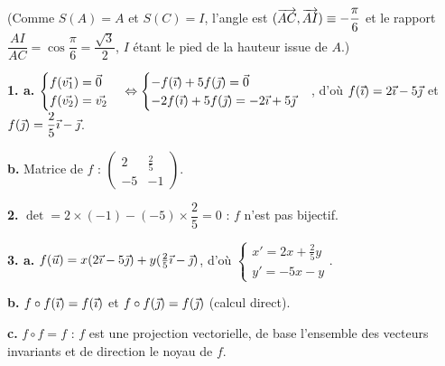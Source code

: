 \documentclass[11pt]{article}
\begin{document}
\begin{center}
\end{center}
(Comme $S(A) = A$ et $S(C) = I$, l'angle est $(\overrightarrow{AC}, \overrightarrow{AI}) \equiv -\dfrac{\pi}{6}$ et le rapport $\dfrac{AI}{AC} = \cos\dfrac{\pi}{6} = \dfrac{\sqrt{3}}{2}$, $I$ étant le pied de la hauteur issue de $A$.)

\textbf{1. a.} $\begin{cases} f(\vec{v_1}) = \vec{0} \\ f(\vec{v_2}) = \vec{v_2} \end{cases} \Leftrightarrow \begin{cases} -f(\vec{\imath}) + 5f(\vec{\jmath}) = \vec{0} \\ -2f(\vec{\imath}) + 5f(\vec{\jmath}) = -2\vec{\imath} + 5\vec{\jmath} \end{cases}$, d'où $f(\vec{\imath}) = 2\vec{\imath} - 5\vec{\jmath}$ et $f(\vec{\jmath}) = \dfrac{2}{5}\vec{\imath} - \vec{\jmath}$.

\textbf{b.} Matrice de $f$ : $\begin{pmatrix} 2 & \frac{2}{5} \\ -5 & -1 \end{pmatrix}$.

\textbf{2.} $\det = 2\times(-1) - (-5)\times\dfrac{2}{5} = 0$ : $f$ n'est pas bijectif.

\textbf{3. a.} $f(\vec{u}) = x(2\vec{\imath} - 5\vec{\jmath}) + y(\tfrac{2}{5}\vec{\imath} - \vec{\jmath})$, d'où $\begin{cases} x' = 2x + \frac{2}{5}y \\ y' = -5x - y \end{cases}$.

\textbf{b.} $f\circ f(\vec{\imath}) = f(\vec{\imath})$ et $f\circ f(\vec{\jmath}) = f(\vec{\jmath})$ (calcul direct).

\textbf{c.} $f\circ f = f$ : $f$ est une projection vectorielle, de base l'ensemble des vecteurs invariants et de direction le noyau de $f$.
\end{document}
